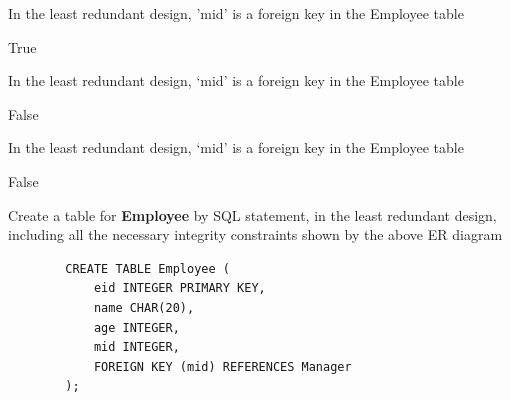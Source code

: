 \documentclass[12pt, letterpaper]{article}
\begin{document}
\begin{subproblem}{}
    In the least redundant design, 'mid' is a foreign key in the Employee table
\end{subproblem}
\begin{solution}
    True
\end{solution}

\begin{subproblem}{}
    In the least redundant design, ‘mid’ is a foreign key in the Employee table
\end{subproblem}
\begin{solution}
    False
\end{solution}

\begin{subproblem}{}
    In the least redundant design, ‘mid’ is a foreign key in the Employee table
\end{subproblem}
\begin{solution}
    False
\end{solution}

\begin{subproblem}{}
    Create a table for \textbf{Employee} by SQL statement, in the least redundant design, including all the
necessary integrity constraints shown by the above ER diagram
\end{subproblem}
\begin{solution}
    \begin{verbatim}
        CREATE TABLE Employee (
            eid INTEGER PRIMARY KEY,
            name CHAR(20),
            age INTEGER,
            mid INTEGER,
            FOREIGN KEY (mid) REFERENCES Manager
        );
    \end{verbatim}
\end{solution}
\end{document}
